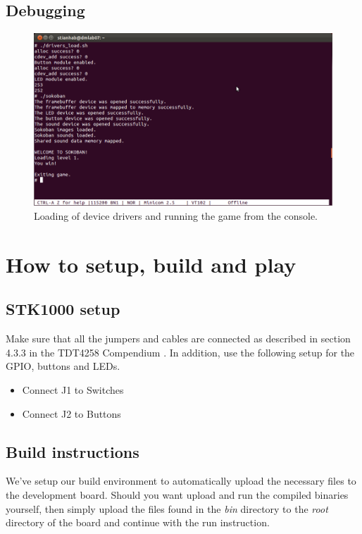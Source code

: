 \documentclass[a4paper,11pt]{article}
\begin{document}
\subsection{Debugging}
\begin{figure}[H]
\centering
\includegraphics[scale=0.4]{images/consolestart.png}
\caption{Loading of device drivers and running the game from the console.}
\label{fig:consolestart}
\end{figure}



\section{How to setup, build and play}
\subsection{STK1000 setup}
Make sure that all the jumpers and cables are connected as described in section 4.3.3 in the TDT4258 Compendium \cite{komp}.
In addition, use the following setup for the GPIO, buttons and LEDs.

\begin{itemize}
\item Connect J1 to Switches
\item Connect J2 to Buttons
\end{itemize}

\subsection{Build instructions}
We've setup our build environment to automatically upload the necessary files to the development board. Should you want upload and run the compiled binaries yourself, then simply upload the files found in the \textit{bin} directory to the \textit{root} directory of the board and continue with the run instruction.
\end{document}
